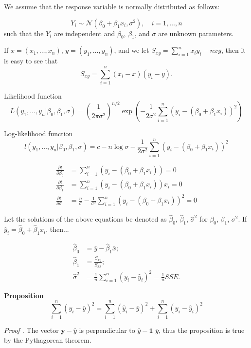 \documentclass[12pt,a4paper,oneside]{book} %
\begin{document}
We assume that the response variable is normally distributed as follows: 

\[ Y_i \sim \mathcal{N}(\beta_0 + \beta_1 x_i, \sigma^2), \quad i = 1, \ldots, n \]
such that the \(Y_i\) are independent and \(\beta_0\), \(\beta_1\), and \(\sigma\) are unknown parameters.

If $x = (x_1, \ldots, x_n)$, $y = (y_1, \ldots, y_n)$, and we let $S_{xy} = \sum_{i=1}^{n} x_i y_i - n\bar{x}\bar{y}$, then it is easy to see that
\[ S_{xy} = \sum_{i=1}^{n} (x_i - \bar{x})(y_i - \bar{y}). \]


Likelihood function
\[
L(y_1, \ldots, y_n | \beta_0, \beta_1, \sigma) = \left( \frac{1}{2\pi\sigma^2} \right)^{n/2} \exp\left( -\frac{1}{2\sigma^2} \sum_{i=1}^{n} (y_i - (\beta_0 + \beta_1 x_i))^2 \right)
\]

Log-likelihood function
\[
l(y_1, \ldots, y_n | \beta_0, \beta_1, \sigma) = c - n \log \sigma - \frac{1}{2\sigma^2} \sum_{i=1}^{n} (y_i - (\beta_0 + \beta_1 x_i))^2
\]


\begin{align*}
\frac{\partial l}{\partial \beta_0} &= \sum_{i=1}^{n} (y_i - (\beta_0 + \beta_1 x_i)) = 0 \\
\frac{\partial l}{\partial \beta_1} &= \sum_{i=1}^{n} (y_i - (\beta_0 + \beta_1 x_i))x_i = 0  \\
\frac{\partial l}{\partial \sigma} &= \frac{n}{\sigma} - \frac{1}{\sigma^3} \sum_{i=1}^{n} (y_i - (\beta_0 + \beta_1 x_i))^2 = 0 
\end{align*}

Let the solutions of the above equations be denoted as $\hat{\beta}_0$, $\hat{\beta}_1$, $\hat{\sigma}^2$ for $\beta_0$, $\beta_1$, $\sigma^2$. If $\hat{y}_i = \hat{\beta}_0 + \hat{\beta}_1 x_i$, then...

\begin{align*}
\hat{\beta}_0  &= \bar{y} - \hat{\beta}_1 \bar{x}; \\
\hat{\beta}_1 &= \frac{S_{xy}}{S_{xx}}; \\
\hat{\sigma}^2 &= \frac{1}{n} \sum_{i=1}^{n} (y_i - \hat{y}_i)^2 = \frac{1}{n} SSE.
\end{align*}


\textbf{Proposition}
\[
\sum_{i=1}^{n} (y_i - \bar{y})^2 = \sum_{i=1}^{n} (\hat{y}_i - \bar{y})^2 + \sum_{i=1}^{n} (y_i - \hat{y}_i)^2
\]

\textit{Proof .} The vector $\textbf{y} - \textbf{$\hat{y}$}$ is perpendicular to $\textbf{$\hat{y}$} - \textbf{1 $\bar{y}$}$, thus the proposition is true by the Pythagorean theorem.
\end{document}
